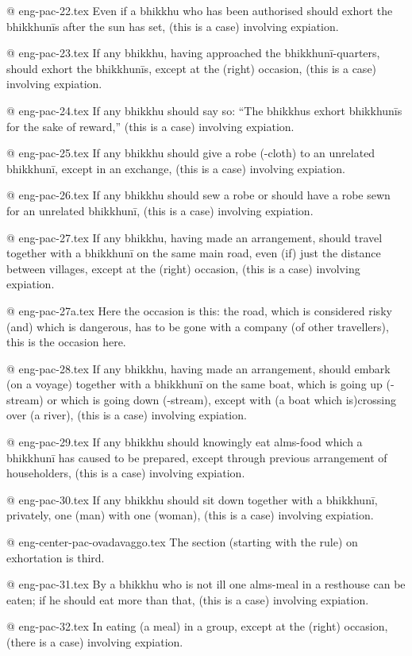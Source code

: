 @ eng-pac-22.tex
Even if a bhikkhu who has been authorised should exhort the bhikkhunīs after the sun has set, (this is a case) involving expiation.

@ eng-pac-23.tex
If any bhikkhu, having approached the bhikkhunī-quarters, should exhort the bhikkhunīs, except at the (right) occasion, (this is a case) involving expiation.

@ eng-pac-24.tex
If any bhikkhu should say so: “The bhikkhus exhort bhikkhunīs for the sake of reward,” (this is a case) involving expiation.

@ eng-pac-25.tex
If any bhikkhu should give a robe (-cloth) to an unrelated bhikkhunī, except in an exchange, (this is a case) involving expiation.

@ eng-pac-26.tex
If any bhikkhu should sew a robe or should have a robe sewn for an unrelated bhikkhunī, (this is a case) involving expiation.

@ eng-pac-27.tex
If any bhikkhu, having made an arrangement, should travel together with a bhikkhunī on the same main road, even (if) just the distance between villages, except at the (right) occasion, (this is a case) involving expiation.

@ eng-pac-27a.tex
Here the occasion is this: the road, which is considered risky (and) which is dangerous, has to be gone 
with a company (of other travellers), this is the occasion here.

@ eng-pac-28.tex
If any bhikkhu, having made an arrangement, should embark (on a voyage) together with a bhikkhunī on the same boat, which is going up (-stream) or which is going down (-stream), except with (a boat which is)crossing over (a river), (this is a case) involving expiation.

@ eng-pac-29.tex
If any bhikkhu should knowingly eat alms-food which a bhikkhunī has caused to be prepared, except through previous arrangement of householders, (this is a case) involving expiation.

@ eng-pac-30.tex
If any bhikkhu should sit down together with a bhikkhunī, privately, one (man) with one (woman), (this is a case) involving expiation.

@ eng-center-pac-ovadavaggo.tex
The section (starting with the rule) on exhortation is third.

@ eng-pac-31.tex
By a bhikkhu who is not ill one alms-meal in a resthouse can be eaten; if he should eat more than that, (this is a case) involving expiation.

@ eng-pac-32.tex
In eating (a meal) in a group, except at the (right) occasion, (there is a case) involving expiation.

